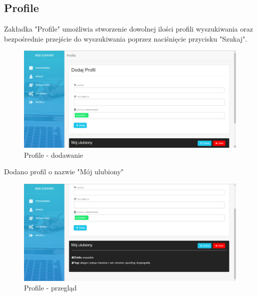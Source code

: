 \documentclass[12pt, titlepage]{article}
\begin{document}
	\subsection{Profile}
	Zakładka "Profile" umożliwia stworzenie dowolnej ilości profili wyszukiwania oraz bezpośrednie przejście do wyszukiwania poprzez naciśnięcie przycisku "Szukaj".
	\begin{figure}[H]
	\centering
	\includegraphics[scale=0.40]{obrazki/profile1.png}
	\caption{Profile - dodawanie}
	\label{fig:db_schema}
	\end{figure}
	\newpage
	Dodano profil o nazwie "Mój ulubiony"
	\begin{figure}[H]
		\centering
		\includegraphics[scale=0.40]{obrazki/profile2.png}
		\caption{Profile - przegląd}
		\label{fig:db_schema}
	\end{figure}

	
	\newpage
\end{document}
